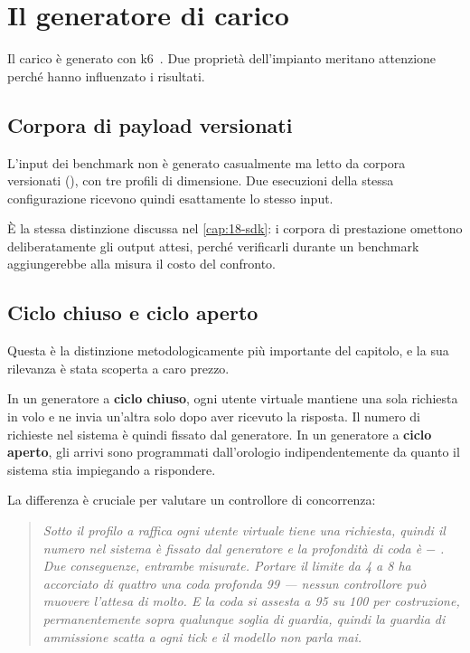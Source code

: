 \section{Il generatore di carico}

Il carico \`e generato con k6~\cite{k6}. Due propriet\`a dell'impianto meritano
attenzione perch\'e hanno influenzato i risultati.

\subsection{Corpora di payload versionati}

L'input dei benchmark non \`e generato casualmente ma letto da corpora
versionati (),
con tre profili di dimensione. Due esecuzioni della stessa configurazione
ricevono quindi esattamente lo stesso input.

\`E la stessa distinzione discussa nel \cref{cap:18-sdk}: i corpora di
prestazione omettono deliberatamente gli output attesi, perch\'e verificarli
durante un benchmark aggiungerebbe alla misura il costo del confronto.

\subsection{Ciclo chiuso e ciclo aperto}

Questa \`e la distinzione metodologicamente pi\`u importante del capitolo, e la
sua rilevanza \`e stata scoperta a caro prezzo.

In un generatore a \textbf{ciclo chiuso}, ogni utente virtuale mantiene una sola
richiesta in volo e ne invia un'altra solo dopo aver ricevuto la risposta. Il
numero di richieste nel sistema \`e quindi fissato dal generatore. In un
generatore a \textbf{ciclo aperto}, gli arrivi sono programmati dall'orologio
indipendentemente da quanto il sistema stia impiegando a rispondere.

La differenza \`e cruciale per valutare un controllore di concorrenza:

\begin{quote}\itshape
Sotto il profilo a raffica ogni utente virtuale tiene una richiesta, quindi il
numero nel sistema \`e fissato dal generatore e la profondit\`a di coda \`e
 $-$ . Due conseguenze, entrambe misurate. Portare il
limite da 4 a 8 ha accorciato di quattro una coda profonda 99 --- nessun
controllore pu\`o muovere l'attesa di molto. E la coda si assesta a 95 su 100 per
costruzione, permanentemente sopra qualunque soglia di guardia, quindi la
guardia di ammissione scatta a ogni tick e il modello non parla mai.
\end{quote}

